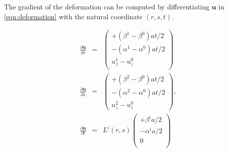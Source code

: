 \documentclass{article}
\begin{document}
The gradient of the deformation can be computed by differentiating $\mathbf{u}$ in \eqref{eqn:deformation} with the natural coordinate $(r,s,t)$.


\begin{eqnarray}
 \frac{\partial\textbf{u}}{\partial r} &=&
 \left(\begin{array}{c} 
+(\beta^1-\beta^0) at/2\\ -(\alpha^1-\alpha^0)at/2 \\ u^1_z-u^0_z\\ \end{array}\right)\\
 \frac{\partial\textbf{u}}{\partial s} &=&
 \left(\begin{array}{c} 
+(\beta^2-\beta^0) at/2\\ -(\alpha^2-\alpha^0)at/2 \\ u^2_z-u^0_z\end{array}\right),\\
 \frac{\partial\textbf{u}}{\partial t} &=&
 L^i(r,s) 
\left(\begin{array}{c} 
+\beta^i a/2\\ -\alpha^ia/2 \\ 0\\ \end{array}\right)
\end{eqnarray}
\end{document}
